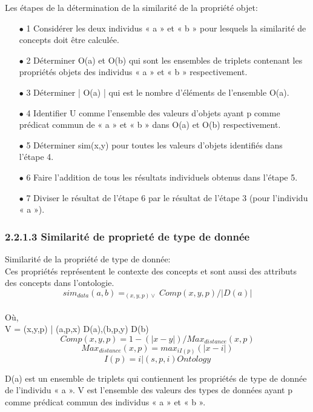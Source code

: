         Les étapes de la détermination de la similarité de la propriété objet:\\
        \begin{itemize}

             \item[\quad $\bullet$]1 Considérer les deux individus « a » et « b » pour lesquels la similarité de concepts doit être calculée.
             \item[\quad $\bullet$]2 Déterminer O(a) et O(b) qui sont les ensembles de triplets contenant les propriétés objets des individus « a » et « b » respectivement.
             \item[\quad $\bullet$]3 Déterminer | O(a) | qui est le nombre d’éléments de l’ensemble O(a).
             \item[\quad $\bullet$]4 Identifier U comme l’ensemble des valeurs d’objets ayant p comme prédicat commun de « a » et « b » dans O(a) et O(b) respectivement.
             \item[\quad $\bullet$]5 Déterminer sim(x,y) pour toutes les valeurs d’objets identifiés dans l’étape 4.
             \item[\quad $\bullet$]6 Faire l’addition de tous les résultats individuels obtenus dans l’étape 5.
             \item[\quad $\bullet$]7 Diviser le résultat de l’étape  6 par le résultat de l’étape 3 (pour l’individu « a »).
          \end{itemize}



    \subsubsection{2.2.1.3 Similarité de proprieté de type de donnée}
        Similarité de la propriété de type de donnée:\\
        Ces propriétés représentent le contexte des concepts et sont aussi des attributs des concepts dans l’ontologie.\\

		$$ sim_{data}(a,b)=_{(x,y,p)\vee}Comp(x,y,p)/|D(a)|$$\\
        Où,\\

		V = {(x,y,p) | (a,p,x)	D(a),(b,p,y) D(b)}\\
		$$ Comp(x,y,p) = 1 - (|x-y|)/ Max_{distance}(x,p)$$
		$$ Max_{distance}(x,p) = max_{ i I(p)}(| x-i |)$$
		$$ I(p) = {i |(s,p,i)  Ontology}$$
		

        D(a) est un ensemble de triplets qui contiennent les propriétés de type de donnée de l’individu « a ».
        V est l’ensemble des valeurs des types de données ayant p comme prédicat commun des individus « a » et « b ».\\

